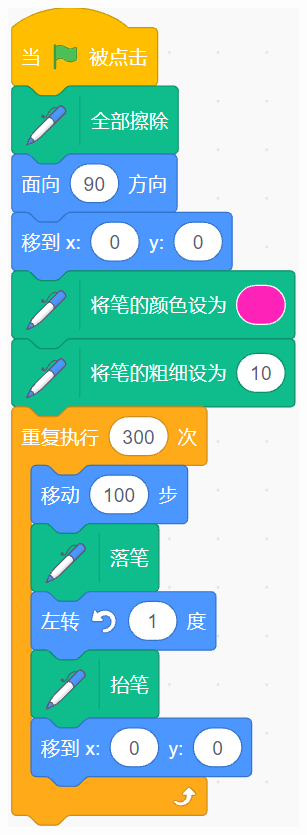 \documentclass[10pt, a4paper]{article}
\begin{document}
\begin{enumerate}
        \begin{figure}[htbp]
            \centering
            \begin{minipage}[t]{.1\textwidth}
                \centering
                \includegraphics[width=\textwidth]{16.png}

\end{minipage}
\end{figure}
\end{enumerate}
\end{document}
